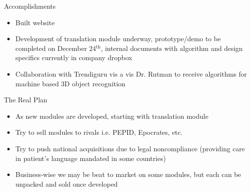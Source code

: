 \documentclass[presentation]{beamer}
\begin{document}
\begin{frame}[label=sec-1-0-8]{Accomplishments}
\begin{itemize}
\item Built website
\item Development of translation module underway, prototype/demo to be
completed on December 24$^{\text{th}}$, internal documents with algorithm and
design specifics currently in company dropbox
\item Collaboration with Trendiguru vis a vis Dr. Rutman to receive
algorithms for machine based 3D object recognition
\end{itemize}
\end{frame}

\begin{frame}[label=sec-1-0-9]{The Real Plan}
\begin{itemize}
\item As new modules are developed, starting with translation module
\item Try to sell modules to rivals i.e. PEPID, Epocrates, etc.
\item Try to push national acquisitions due to legal noncompliance
(providing care in patient's language mandated in some countries)
\item Business-wise we may be beat to market on some modules, but each can
be unpacked and sold once developed
\end{itemize}
\end{frame}
\end{document}
